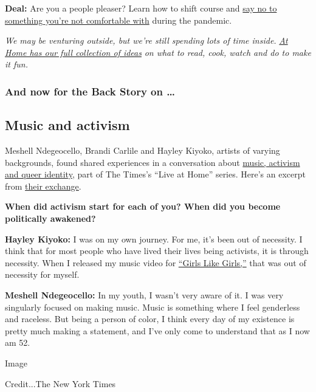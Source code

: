 \textbf{Deal:} Are you a people pleaser? Learn how to shift course and
\href{https://www.nytimes.com/2020/07/16/smarter-living/people-pleaser-coronavirus.html?action=click\&module=RelatedLinks\&pgtype=collection}{say
no to something you're not comfortable with} during the pandemic.

\emph{We may be venturing outside, but we're still spending lots of time
inside.} \href{https://www.nytimes.com/spotlight/at-home}{\emph{At Home
has our full collection of ideas}} \emph{on what to read, cook, watch
and do to make it fun.}

\hypertarget{and-now-for-the-back-story-on-}{%
\subsubsection{And now for the Back Story on
\ldots{}}\label{and-now-for-the-back-story-on-}}

\hypertarget{music-and-activism}{%
\subsection{Music and activism}\label{music-and-activism}}

Meshell Ndegeocello, Brandi Carlile and Hayley Kiyoko, artists of
varying backgrounds, found shared experiences in a conversation about
\href{https://timesevents.nytimes.com/musicandqueering}{music, activism
and queer identity}, part of The Times's ``Live at Home'' series. Here's
an excerpt from
\href{https://www.nytimes.com/2020/07/15/insider/music-queer-activism.html}{their
exchange}.

\textbf{When did activism start for each of you? When did you become
politically awakened?}

\textbf{Hayley Kiyoko:} I was on my own journey. For me, it's been out
of necessity. I think that for most people who have lived their lives
being activists, it is through necessity. When I released my music video
for \href{https://www.youtube.com/watch?v=I0MT8SwNa_U}{``Girls Like
Girls,''} that was out of necessity for myself.

\textbf{Meshell Ndegeocello:} In my youth, I wasn't very aware of it. I
was very singularly focused on making music. Music is something where I
feel genderless and raceless. But being a person of color, I think every
day of my existence is pretty much making a statement, and I've only
come to understand that as I now am 52.

Image

Credit...The New York Times

